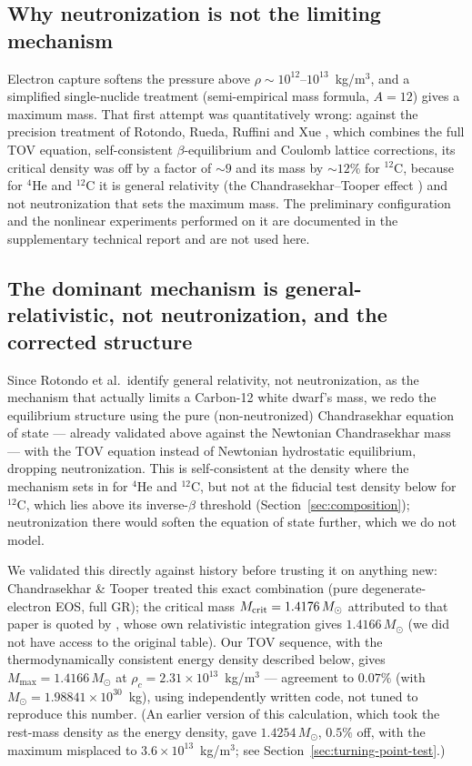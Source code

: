 \documentclass[11pt]{article}
\begin{document}
\subsection{Why neutronization is not the limiting mechanism}
\label{sec:neutronization-main}

Electron capture softens the pressure above $\rho\sim10^{12}$--$10^{13}$~kg/m$^3$, and a simplified single-nuclide treatment (semi-empirical mass formula, $A=12$) gives a maximum mass. That first attempt was quantitatively wrong: against the precision treatment of Rotondo, Rueda, Ruffini and Xue \citep{RotondoRRX2011}, which combines the full TOV equation, self-consistent $\beta$-equilibrium and Coulomb lattice corrections, its critical density was off by a factor of $\sim9$ and its mass by $\sim12\%$ for $^{12}$C, because for $^{4}$He and $^{12}$C it is general relativity (the Chandrasekhar--Tooper effect \citep{ChandrasekharTooper1964}) and not neutronization that sets the maximum mass. The preliminary configuration and the nonlinear experiments performed on it are documented in the supplementary technical report \citep{OwnbyPhase2} and are not used here.

\subsection{The dominant mechanism is general-relativistic, not neutronization, and the corrected structure}
\label{sec:gr-corrected}

Since Rotondo et al.\ identify general relativity, not neutronization, as the mechanism that actually limits a Carbon-12 white dwarf's mass, we redo the equilibrium structure using the pure (non-neutronized) Chandrasekhar equation of state --- already validated above against the Newtonian Chandrasekhar mass --- with the TOV equation instead of Newtonian hydrostatic equilibrium, dropping neutronization. This is self-consistent at the density where the mechanism sets in for $^{4}$He and $^{12}$C, but not at the fiducial test density below for $^{12}$C, which lies above its inverse-$\beta$ threshold (Section~\ref{sec:composition}); neutronization there would soften the equation of state further, which we do not model.

We validated this directly against history before trusting it on anything new: Chandrasekhar \& Tooper \citep{ChandrasekharTooper1964} treated this exact combination (pure degenerate-electron EOS, full GR); the critical mass $M_{\rm crit}=1.4176\,M_\odot$ attributed to that paper is quoted by \citet{MathewNandy2014}, whose own relativistic integration gives $1.4166\,M_\odot$ (we did not have access to the original table). Our TOV sequence, with the thermodynamically consistent energy density described below, gives $M_{\max}=1.4166\,M_\odot$ at $\rho_c=2.31\times10^{13}$~kg/m$^3$ --- agreement to $0.07\%$ (with $M_\odot=1.98841\times10^{30}$~kg), using independently written code, not tuned to reproduce this number. (An earlier version of this calculation, which took the rest-mass density as the energy density, gave $1.4254\,M_\odot$, $0.5\%$ off, with the maximum misplaced to $3.6\times10^{13}$~kg/m$^3$; see Section~\ref{sec:turning-point-test}.)
\end{document}
